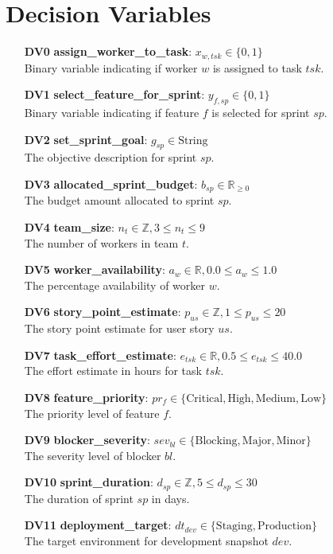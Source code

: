 \documentclass[11pt]{article}
\begin{document}
\section{Decision Variables}
\begin{itemize}
    \item[\textbf{DV0}] \textbf{assign\_worker\_to\_task}: $x_{w, tsk} \in \{0, 1\}$ \\ Binary variable indicating if worker $w$ is assigned to task $tsk$.
    \item[\textbf{DV1}] \textbf{select\_feature\_for\_sprint}: $y_{f, sp} \in \{0, 1\}$ \\ Binary variable indicating if feature $f$ is selected for sprint $sp$.
    \item[\textbf{DV2}] \textbf{set\_sprint\_goal}: $g_{sp} \in \text{String}$ \\ The objective description for sprint $sp$.
    \item[\textbf{DV3}] \textbf{allocated\_sprint\_budget}: $b_{sp} \in \mathbb{R}_{\geq 0}$ \\ The budget amount allocated to sprint $sp$.
    \item[\textbf{DV4}] \textbf{team\_size}: $n_t \in \mathbb{Z}, 3 \leq n_t \leq 9$ \\ The number of workers in team $t$.
    \item[\textbf{DV5}] \textbf{worker\_availability}: $a_w \in \mathbb{R}, 0.0 \leq a_w \leq 1.0$ \\ The percentage availability of worker $w$.
    \item[\textbf{DV6}] \textbf{story\_point\_estimate}: $p_{us} \in \mathbb{Z}, 1 \leq p_{us} \leq 20$ \\ The story point estimate for user story $us$.
    \item[\textbf{DV7}] \textbf{task\_effort\_estimate}: $e_{tsk} \in \mathbb{R}, 0.5 \leq e_{tsk} \leq 40.0$ \\ The effort estimate in hours for task $tsk$.
    \item[\textbf{DV8}] \textbf{feature\_priority}: $pr_f \in \{\text{Critical}, \text{High}, \text{Medium}, \text{Low}\}$ \\ The priority level of feature $f$.
    \item[\textbf{DV9}] \textbf{blocker\_severity}: $sev_{bl} \in \{\text{Blocking}, \text{Major}, \text{Minor}\}$ \\ The severity level of blocker $bl$.
    \item[\textbf{DV10}] \textbf{sprint\_duration}: $d_{sp} \in \mathbb{Z}, 5 \leq d_{sp} \leq 30$ \\ The duration of sprint $sp$ in days.
    \item[\textbf{DV11}] \textbf{deployment\_target}: $dt_{dev} \in \{\text{Staging}, \text{Production}\}$ \\ The target environment for development snapshot $dev$.
\end{itemize}
\end{document}
